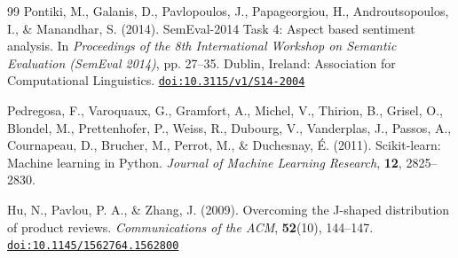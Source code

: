 \documentclass[12pt, a4paper]{article}
\newcommand{\doi}[1]{\href{https://doi.org/#1}{\texttt{doi:#1}}}
\begin{document}
\begin{thebibliography}{99}
Pontiki, M., Galanis, D., Pavlopoulos, J., Papageorgiou, H.,
Androutsopoulos, I., \& Manandhar, S. (2014).
SemEval-2014 Task 4: Aspect based sentiment analysis.
In \textit{Proceedings of the 8th International Workshop on Semantic Evaluation
(SemEval 2014)}, pp. 27--35.
Dublin, Ireland: Association for Computational Linguistics.
\doi{10.3115/v1/S14-2004}


Pedregosa, F., Varoquaux, G., Gramfort, A., Michel, V., Thirion, B.,
Grisel, O., Blondel, M., Prettenhofer, P., Weiss, R., Dubourg, V.,
Vanderplas, J., Passos, A., Cournapeau, D., Brucher, M., Perrot, M.,
\& Duchesnay, \'{E}. (2011).
Scikit-learn: Machine learning in Python.
\textit{Journal of Machine Learning Research}, \textbf{12}, 2825--2830.


Hu, N., Pavlou, P. A., \& Zhang, J. (2009).
Overcoming the J-shaped distribution of product reviews.
\textit{Communications of the ACM}, \textbf{52}(10), 144--147.
\doi{10.1145/1562764.1562800}

\end{thebibliography}
\end{document}
